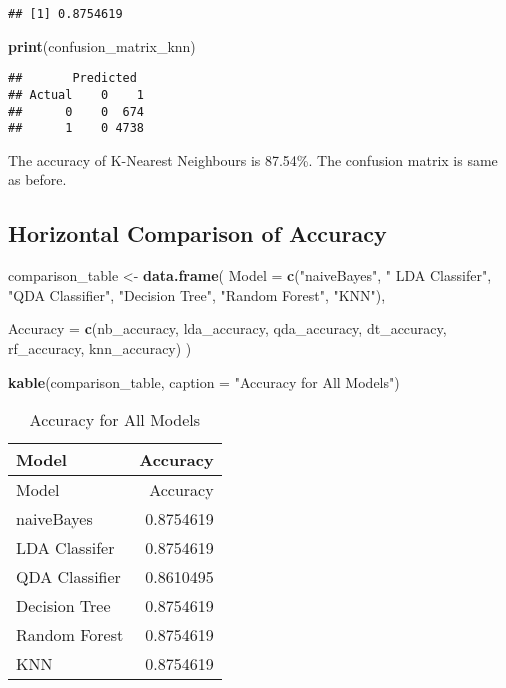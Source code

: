 \documentclass[
]{article}
\newenvironment{Shaded}{\begin{snugshade}}{\end{snugshade}}
\newcommand{\AttributeTok}[1]{\textcolor[rgb]{0.13,0.29,0.53}{#1}}
\newcommand{\FunctionTok}[1]{\textcolor[rgb]{0.13,0.29,0.53}{\textbf{#1}}}
\newcommand{\NormalTok}[1]{#1}
\newcommand{\OtherTok}[1]{\textcolor[rgb]{0.56,0.35,0.01}{#1}}
\newcommand{\StringTok}[1]{\textcolor[rgb]{0.31,0.60,0.02}{#1}}
\begin{document}
\begin{verbatim}
## [1] 0.8754619
\end{verbatim}

\begin{Shaded}
\begin{Highlighting}[]
\FunctionTok{print}\NormalTok{(confusion\_matrix\_knn)}
\end{Highlighting}
\end{Shaded}

\begin{verbatim}
##       Predicted
## Actual    0    1
##      0    0  674
##      1    0 4738
\end{verbatim}

The accuracy of K-Nearest Neighbours is 87.54\%. The confusion matrix is
same as before.

\hypertarget{horizontal-comparison-of-accuracy}{%
\subsection{Horizontal Comparison of
Accuracy}\label{horizontal-comparison-of-accuracy}}

\begin{Shaded}
\begin{Highlighting}[]
\NormalTok{comparison\_table }\OtherTok{\textless{}{-}} \FunctionTok{data.frame}\NormalTok{(}
  \AttributeTok{Model =} \FunctionTok{c}\NormalTok{(}\StringTok{"naiveBayes"}\NormalTok{, }
            \StringTok{" LDA Classifer"}\NormalTok{, }
            \StringTok{"QDA Classifier"}\NormalTok{,}
            \StringTok{"Decision Tree"}\NormalTok{,}
            \StringTok{"Random Forest"}\NormalTok{,}
            \StringTok{"KNN"}\NormalTok{),}
  
  \AttributeTok{Accuracy =} \FunctionTok{c}\NormalTok{(nb\_accuracy, }
\NormalTok{               lda\_accuracy, }
\NormalTok{               qda\_accuracy,}
\NormalTok{               dt\_accuracy,}
\NormalTok{               rf\_accuracy,}
\NormalTok{               knn\_accuracy)}
\NormalTok{)}

\FunctionTok{kable}\NormalTok{(comparison\_table, }\AttributeTok{caption =} \StringTok{"Accuracy for All Models"}\NormalTok{)}
\end{Highlighting}
\end{Shaded}

\begin{longtable}[]{@{}lr@{}}
\caption{Accuracy for All Models}\tabularnewline
\toprule\noalign{}
Model & Accuracy \\
\midrule\noalign{}
\endfirsthead
\toprule\noalign{}
Model & Accuracy \\
\midrule\noalign{}
\endhead
\bottomrule\noalign{}
\endlastfoot
naiveBayes & 0.8754619 \\
LDA Classifer & 0.8754619 \\
QDA Classifier & 0.8610495 \\
Decision Tree & 0.8754619 \\
Random Forest & 0.8754619 \\
KNN & 0.8754619 \\
\end{longtable}
\end{document}
